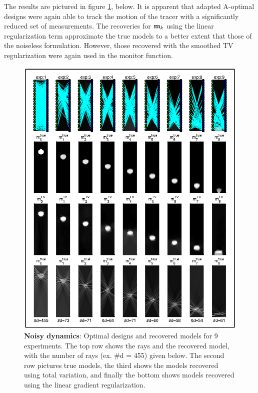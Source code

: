 \documentclass[final,leqno,onefignum,onetabnum]{siamltexmm}
\begin{document}
The results are pictured in figure \ref{fig:results2}, below. It is apparent that adapted A-optimal designs were again able to track the motion of the tracer with a significantly reduced set of measurements. The recoveries for ${\bf{m}}_k$ using the linear regularization term approximate the true models to a better extent that those of the noiseless formulation. However, those recovered with the smoothed TV regularization were again used in the monitor function. 
\begin{figure}
	\begin{center}
	\iwidth=160mm
	\includegraphics[width = 1\iwidth]{figures/noisyFigs/NoisyResults.eps}
	\end{center}
	\caption{{\bf Noisy dynamics}: Optimal designs and recovered models for 9 experiments. The top row shows the rays and the recovered model, with the number of rays (ex. \#d = 455) given below. The second row pictures true models, the third shows the  models recovered using total variation, and finally the bottom shows models recovered using the linear gradient regularization.}
	\label{fig:results2}
\end{figure}
%
%
%
\end{document}
